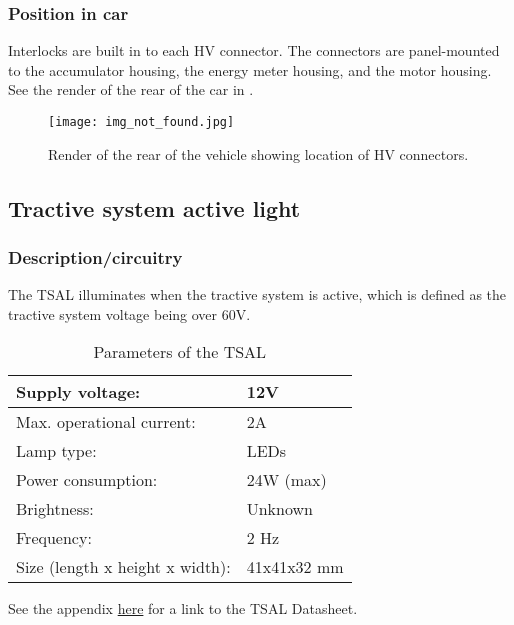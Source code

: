\documentclass{article}
\begin{document}
\subsubsection{Position in car}
Interlocks are built in to each HV connector. The connectors are panel-mounted to the accumulator housing, the energy meter housing, and the motor housing. See the render of the rear of the car in .

\begin{figure}[H]
\centering
\texttt{[image: img\_not\_found.jpg]}
\caption{Render of the rear of the vehicle showing location of HV connectors.}
\label{fig:rear_of_car}
\end{figure}

\subsection{Tractive system active light}\label{tractive_system_active_light}
\subsubsection{Description/circuitry}
The TSAL illuminates when the tractive system is active, which is defined as the tractive system voltage being over 60V.

	\begin{table}[H]
	    \centering
	    \begin{tabular}{|l|l|}
	    \hline
	    Supply voltage: & 12V \\ \hline
	    Max. operational current: &  2A\\ \hline
	    Lamp type: & LEDs \\ \hline
	    Power consumption: & 24W (max)\\ \hline
	    Brightness: & Unknown\\ \hline
	    Frequency: & 2 Hz \\ \hline
	    Size (length x height x width): & 41x41x32 mm \\ \hline
	    \end{tabular}
	    \caption{Parameters of the TSAL}
	    \label{TSALparameters}
	\end{table}
	
See the appendix \hyperlink{TSALdatasheet}{here} for a link to the TSAL Datasheet.
\end{document}

